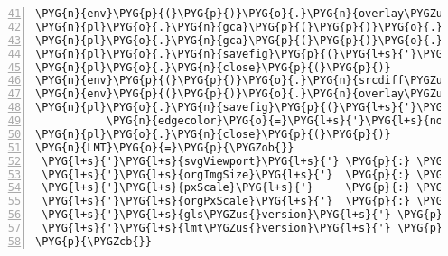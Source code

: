 \begin{Verbatim}[commandchars=\\\{\},numbers=left,firstnumber=41,stepnumber=1,codes={\catcode`\$=3\catcode`\^=7\catcode`\_=8}]
\PYG{n}{env}\PYG{p}{(}\PYG{p}{)}\PYG{o}{.}\PYG{n}{overlay\PYGZus{}input\PYGZus{}points}\PYG{p}{(}\PYG{n}{env}\PYG{p}{(}\PYG{p}{)}\PYG{o}{.}\PYG{n}{ensemble\PYGZus{}average}\PYG{p}{)}
\PYG{n}{pl}\PYG{o}{.}\PYG{n}{gca}\PYG{p}{(}\PYG{p}{)}\PYG{o}{.}\PYG{n}{axes}\PYG{o}{.}\PYG{n}{get\PYGZus{}xaxis}\PYG{p}{(}\PYG{p}{)}\PYG{o}{.}\PYG{n}{set\PYGZus{}visible}\PYG{p}{(}\PYG{n+nb+bp}{False}\PYG{p}{)}
\PYG{n}{pl}\PYG{o}{.}\PYG{n}{gca}\PYG{p}{(}\PYG{p}{)}\PYG{o}{.}\PYG{n}{axes}\PYG{o}{.}\PYG{n}{get\PYGZus{}yaxis}\PYG{p}{(}\PYG{p}{)}\PYG{o}{.}\PYG{n}{set\PYGZus{}visible}\PYG{p}{(}\PYG{n+nb+bp}{False}\PYG{p}{)}
\PYG{n}{pl}\PYG{o}{.}\PYG{n}{savefig}\PYG{p}{(}\PYG{l+s}{'}\PYG{l+s}{../tmp\PYGZus{}media/009719/img3.png}\PYG{l+s}{'}\PYG{p}{)}
\PYG{n}{pl}\PYG{o}{.}\PYG{n}{close}\PYG{p}{(}\PYG{p}{)}
\PYG{n}{env}\PYG{p}{(}\PYG{p}{)}\PYG{o}{.}\PYG{n}{srcdiff\PYGZus{}plot\PYGZus{}adv}\PYG{p}{(}\PYG{n}{env}\PYG{p}{(}\PYG{p}{)}\PYG{o}{.}\PYG{n}{ensemble\PYGZus{}average}\PYG{p}{,} \PYG{n}{night}\PYG{o}{=}\PYG{n+nb+bp}{True}\PYG{p}{,} \PYG{n}{upsample}\PYG{o}{=}\PYG{l+m+mi}{8}\PYG{p}{)}
\PYG{n}{env}\PYG{p}{(}\PYG{p}{)}\PYG{o}{.}\PYG{n}{overlay\PYGZus{}input\PYGZus{}points}\PYG{p}{(}\PYG{n}{env}\PYG{p}{(}\PYG{p}{)}\PYG{o}{.}\PYG{n}{ensemble\PYGZus{}average}\PYG{p}{)}
\PYG{n}{pl}\PYG{o}{.}\PYG{n}{savefig}\PYG{p}{(}\PYG{l+s}{'}\PYG{l+s}{../tmp\PYGZus{}media/009719/img3\PYGZus{}ipol.png}\PYG{l+s}{'}\PYG{p}{,} \PYG{n}{facecolor}\PYG{o}{=}\PYG{l+s}{'}\PYG{l+s}{black}\PYG{l+s}{'}\PYG{p}{,}
           \PYG{n}{edgecolor}\PYG{o}{=}\PYG{l+s}{'}\PYG{l+s}{none}\PYG{l+s}{'}\PYG{p}{)}
\PYG{n}{pl}\PYG{o}{.}\PYG{n}{close}\PYG{p}{(}\PYG{p}{)}
\PYG{n}{LMT}\PYG{o}{=}\PYG{p}{\PYGZob{}}
 \PYG{l+s}{'}\PYG{l+s}{svgViewport}\PYG{l+s}{'} \PYG{p}{:} \PYG{l+m+mi}{500}\PYG{p}{,}
 \PYG{l+s}{'}\PYG{l+s}{orgImgSize}\PYG{l+s}{'}  \PYG{p}{:} \PYG{l+m+mi}{440}\PYG{p}{,}
 \PYG{l+s}{'}\PYG{l+s}{pxScale}\PYG{l+s}{'}     \PYG{p}{:} \PYG{l+m+mf}{0.16456}\PYG{p}{,}
 \PYG{l+s}{'}\PYG{l+s}{orgPxScale}\PYG{l+s}{'}  \PYG{p}{:} \PYG{l+m+mf}{0.18700}\PYG{p}{,}
 \PYG{l+s}{'}\PYG{l+s}{gls\PYGZus{}version}\PYG{l+s}{'} \PYG{p}{:} \PYG{l+s}{'}\PYG{l+s}{v4}\PYG{l+s}{'}\PYG{p}{,}
 \PYG{l+s}{'}\PYG{l+s}{lmt\PYGZus{}version}\PYG{l+s}{'} \PYG{p}{:} \PYG{l+s}{'}\PYG{l+s}{v1.6.3}\PYG{l+s}{'}\PYG{p}{,}
\PYG{p}{\PYGZcb{}}
\end{Verbatim}
